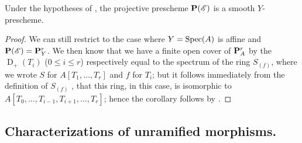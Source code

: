 \begin{corollary}[17.3.9]
\label{IV.17.3.9}
Under the hypotheses of , the projective prescheme $\mathbf{P}(\mathscr{E})$  is a smooth $Y$-prescheme.
\end{corollary}

\begin{proof}
We can still restrict to the case where $Y=\operatorname{Spec}(A)$ is affine and $\mathbf{P}(\mathscr{E})=\mathbf{P}_Y^r$.
We then know  that we have a finite open cover of $\mathbf{P}^r_{A}$ by the $\operatorname{D}_+(T_i)$ ($0\leq i\leq r$) respectively equal to the spectrum of the ring $S_{(f)}$, where we wrote $S$ for $A[T_1,\dots,T_r]$ and $f$ for $T_i$;
but it follows immediately from the definition of $S_{(f)}$ , that this ring, in this case, is isomorphic to $A[T_0,\dots,T_{i-1},T_{i+1},\dots,T_r]$;
hence the corollary follows by .
\end{proof}

\subsection{Characterizations of unramified morphisms.}
\label{subection:IV.17.4} 



